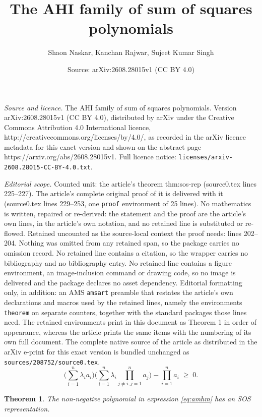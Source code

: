 \documentclass[10pt,a4paper]{amsart}
\title{The AHI family of sum of squares polynomials}
\author{Shaon Naskar, Kanchan Rajwar, Sujeet Kumar Singh}
\date{Source: arXiv:2608.28015v1 (CC BY 4.0)}
\newtheorem{theorem}{Theorem}
\begin{document}
\maketitle

\noindent\emph{Source and licence.} The AHI family of sum of squares polynomials. Version arXiv:2608.28015v1 (CC BY 4.0), distributed by arXiv under the Creative Commons Attribution 4.0 International licence, http://creativecommons.org/licenses/by/4.0/, as recorded in the arXiv licence metadata for this exact version and shown on the abstract page https://arxiv.org/abs/2608.28015v1. Full licence notice: \texttt{licenses/arxiv-2608.28015-CC-BY-4.0.txt}.\par\smallskip

\noindent\textit{Editorial scope.} Counted unit: the article's theorem thm:sos-rep (source0.tex lines 225--227). The article's complete original proof of it is delivered with it (source0.tex lines 229--253, one \texttt{proof} environment of 25 lines). No mathematics is written, repaired or re-derived: the statement and the proof are the article's own lines, in the article's own notation, and no retained line is substituted or re-flowed.  Retained uncounted as the source-local context the proof needs: lines 202--204.  Nothing was omitted from any retained span, so the package carries no omission record.  No retained line contains a citation, so the wrapper carries no bibliography and no bibliography entry.  No retained line contains a figure environment, an image-inclusion command or drawing code, so no image is delivered and the package declares no asset dependency.  Editorial formatting only, in addition: an AMS \texttt{amsart} preamble that restates the article's own declarations and macros used by the retained lines, namely the environments \texttt{theorem} on separate counters, together with the standard packages those lines need.  The retained environments print in this document as Theorem 1 in order of appearance, whereas the article prints the same items with the numbering of its own full document.  The complete native source of the article as distributed in the arXiv e-print for this exact version is bundled unchanged as \texttt{sources/208752/source0.tex}.
\begin{equation}\label{eq:amhm}
\Big(\sum_{i=1}^n \lambda_i a_i\Big) \Big(\sum_{i=1}^n \lambda_i \prod_{{j\neq i}, j=1}^n a_j\Big) - \prod_{i=1}^n a_i \;\geq\; 0 .
\end{equation}

\begin{theorem}\label{thm:sos-rep}
The non-negative polynomial in expression \eqref{eq:amhm} has an SOS representation.
\end{theorem}
\end{document}
